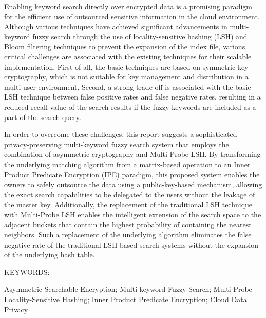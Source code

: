 \documentclass[BTech]{iiitdmdiss}
\begin{document}
\abstract

Enabling keyword search directly over encrypted data is a promising paradigm for the efficient use of outsourced sensitive information in the cloud environment. Although various techniques have achieved significant advancements in multi-keyword fuzzy search through the use of locality-sensitive hashing (LSH) and Bloom filtering techniques to prevent the expansion of the index file, various critical challenges are associated with the existing techniques for their scalable implementation. First of all, the basic techniques are based on symmetric-key cryptography, which is not suitable for key management and distribution in a multi-user environment. Second, a strong trade-off is associated with the basic LSH technique between false positive rates and false negative rates, resulting in a reduced recall value of the search results if the fuzzy keywords are included as a part of the search query.

In order to overcome these challenges, this report suggests a sophisticated privacy-preserving multi-keyword fuzzy search system that employs the combination of asymmetric cryptography and Multi-Probe LSH. By transforming the underlying matching algorithm from a matrix-based operation to an Inner Product Predicate Encryption (IPE) paradigm, this proposed system enables the owners to safely outsource the data using a public-key-based mechanism, allowing the exact search capabilities to be delegated to the users without the leakage of the master key. Additionally, the replacement of the traditional LSH technique with Multi-Probe LSH enables the intelligent extension of the search space to the adjacent buckets that contain the highest probability of containing the nearest neighbors. Such a replacement of the underlying algorithm eliminates the false negative rate of the traditional LSH-based search systems without the expansion of the underlying hash table.

\vspace{10pt}
\noindent KEYWORDS: \hspace*{0.5em} \parbox[t]{4.4in}{Asymmetric Searchable Encryption; Multi-keyword Fuzzy Search; Multi-Probe Locality-Sensitive Hashing; Inner Product Predicate Encryption; Cloud Data Privacy}

\pagebreak

\end{document}
